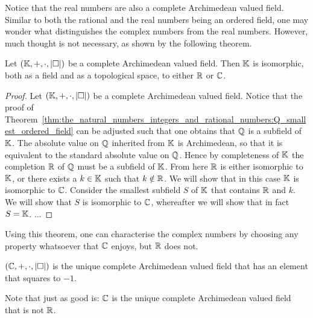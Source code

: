 \documentclass[../main.tex]{subfiles}
\begin{document}
Notice that the real numbers are also a complete Archimedean valued field. Similar to both the rational and the real numbers being an ordered field, one may wonder what distinguishes the complex numbers from the real numbers. However, much thought is not necessary, as shown by the following theorem.
\begin{theorem}\label{thm:the_complex_numbers:ostrowskis_second_theorem}
    Let $(\mathbb{K},+,\cdot,\vert\Box\vert)$ be a complete Archimedean valued field. Then $\mathbb{K}$ is isomorphic, both as a field and as a topological space, to either $\mathbb{R}$ or $\mathbb{C}$.
\end{theorem}
\begin{proof}
    Let $(\mathbb{K},+,\cdot,\vert\Box\vert)$ be a complete Archimedean valued field. Notice that the proof of Theorem~\ref{thm:the_natural_numbers_integers_and_rational_numbers:Q_smallest_ordered_field} can be adjusted such that one obtains that $\mathbb{Q}$ is a subfield of $\mathbb{K}$. The absolute value on $\mathbb{Q}$ inherited from $\mathbb{K}$ is Archimedean, so that it is equivalent to the standard absolute value on $\mathbb{Q}$. Hence by completeness of $\mathbb{K}$ the completion $\mathbb{R}$ of $\mathbb{Q}$ must be a subfield of $\mathbb{K}$. From here $\mathbb{R}$ is either isomorphic to $\mathbb{K}$, or there exists a $k\in\mathbb{K}$ such that $k\notin\mathbb{R}$. We will show that in this case $\mathbb{K}$ is isomorphic to $\mathbb{C}$. Consider the smallest subfield $S$ of $\mathbb{K}$ that contains $\mathbb{R}$ and $k$. We will show that $S$ is isomorphic to $\mathbb{C}$, whereafter we will show that in fact $S=\mathbb{K}$. ...
\end{proof}
Using this theorem, one can characterise the complex numbers by choosing any property whatsoever that $\mathbb{C}$ enjoys, but $\mathbb{R}$ does not.
\begin{corollary}
    $(\mathbb{C},+,\cdot,\vert\Box\vert)$ is the unique complete Archimedean valued field that has an element that squares to $-1$.
\end{corollary}
Note that just as good is: $\mathbb{C}$ is the unique complete Archimedean valued field that is not $\mathbb{R}$.
\end{document}
